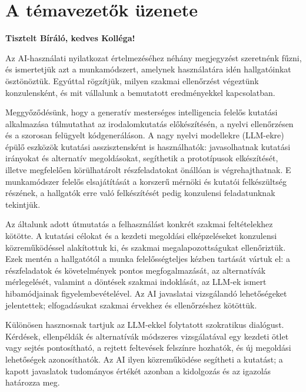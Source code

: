 \chapter*{A témavezetők üzenete}
\begingroup
{}

\noindent\textbf{Tisztelt Bíráló, kedves Kolléga!}

Az AI-használati nyilatkozat értelmezéséhez néhány megjegyzést szeretnénk fűzni, és ismertetjük azt a munkamódszert, amelynek használatára idén hallgatóinkat ösztönöztük. Egyúttal rögzítjük, milyen szakmai ellenőrzést végeztünk konzulensként, és mit vállalunk a bemutatott eredményekkel kapcsolatban.

Meggyőződésünk, hogy a generatív mesterséges intelligencia felelős kutatási alkalmazása túlmutathat az irodalomkutatás előkészítésén, a nyelvi ellenőrzésen és a szorosan felügyelt kódgeneráláson. A nagy nyelvi modellekre (LLM-ekre) épülő eszközök kutatási asszisztensként is használhatók: javasolhatnak kutatási irányokat és alternatív megoldásokat, segíthetik a prototípusok elkészítését, illetve megfelelően körülhatárolt részfeladatokat önállóan is végrehajthatnak. E munkamódszer felelős elsajátítását a korszerű mérnöki és kutatói felkészültség részének, a hallgatók erre való felkészítését pedig konzulensi feladatunknak tekintjük.

Az általunk adott útmutatás a felhasználást konkrét szakmai feltételekhez kötötte. A kutatási célokat és a kezdeti megoldási elképzeléseket konzulensi közreműködéssel alakítottuk ki, és szakmai megalapozottságukat ellenőriztük. Ezek mentén a hallgatótól a munka felelősségteljes kézben tartását vártuk el: a részfeladatok és követelmények pontos megfogalmazását, az alternatívák mérlegelését, valamint a döntések szakmai indoklását, az LLM-ek ismert hibamódjainak figyelembevételével. Az AI javaslatai vizsgálandó lehetőségeket jelentettek; elfogadásukat szakmai érvekhez és ellenőrzéshez kötöttük.

Különösen hasznosnak tartjuk az LLM-ekkel folytatott szokratikus dialógust. Kérdések, ellenpéldák és alternatívák módszeres vizsgálatával egy kezdeti ötlet vagy sejtés pontosítható, a rejtett feltevések felszínre hozhatók, és új megoldási lehetőségek azonosíthatók. Az AI ilyen közreműködése segítheti a kutatást; a kapott javaslatok tudományos értékét azonban a kidolgozás és az igazolás határozza meg.

